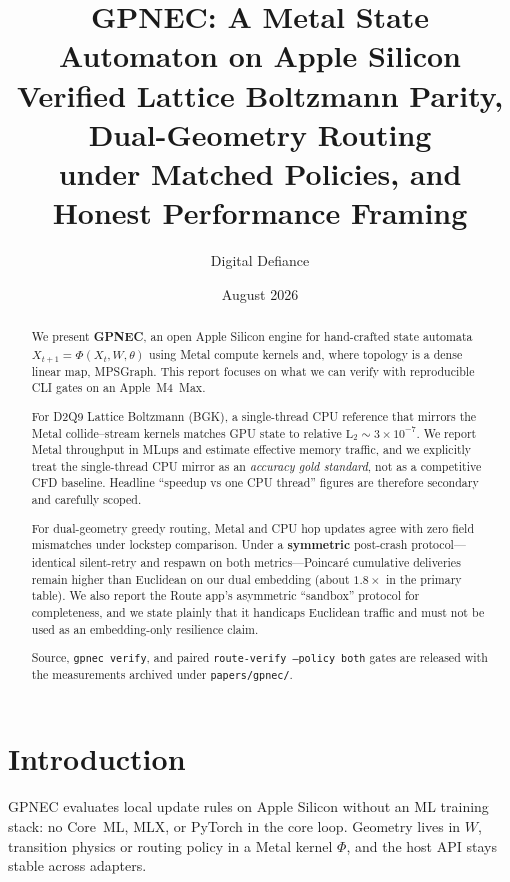 \documentclass[11pt,a4paper]{article}
\title{GPNEC: A Metal State Automaton on Apple Silicon\\
\large Verified Lattice Boltzmann Parity, Dual-Geometry Routing\\
under Matched Policies, and Honest Performance Framing}
\author{Digital Defiance}
\date{August 2026}
\begin{document}
\maketitle

\begin{abstract}
We present \textbf{GPNEC}, an open Apple Silicon engine for hand-crafted
state automata $X_{t+1}=\Phi(X_t,W,\theta)$ using Metal compute kernels and,
where topology is a dense linear map, MPSGraph. This report focuses on what
we can verify with reproducible CLI gates on an Apple~M4~Max.

For D2Q9 Lattice Boltzmann (BGK), a single-thread CPU reference that mirrors
the Metal collide--stream kernels matches GPU state to relative
$\mathrm{L}_2\sim3\times10^{-7}$. We report Metal throughput in MLups and
estimate effective memory traffic, and we explicitly treat the single-thread
CPU mirror as an \emph{accuracy gold standard}, not as a competitive CFD
baseline. Headline ``speedup vs one CPU thread'' figures are therefore
secondary and carefully scoped.

For dual-geometry greedy routing, Metal and CPU hop updates agree with zero
field mismatches under lockstep comparison. Under a \textbf{symmetric}
post-crash protocol---identical silent-retry and respawn on both
metrics---Poincar\'e cumulative deliveries remain higher than Euclidean on
our dual embedding (about $1.8\times$ in the primary table). We also report
the Route app's asymmetric ``sandbox'' protocol for completeness, and we
state plainly that it handicaps Euclidean traffic and must not be used as an
embedding-only resilience claim.

Source, \texttt{gpnec verify}, and paired \texttt{route-verify --policy both}
gates are released with the measurements archived under
\texttt{papers/gpnec/}.
\end{abstract}

\tableofcontents
\newpage

\section{Introduction}
\label{sec:intro}

GPNEC evaluates local update rules on Apple Silicon without an ML training
stack: no Core~ML, MLX, or PyTorch in the core loop. Geometry lives in $W$,
transition physics or routing policy in a Metal kernel $\Phi$, and the host
API stays stable across adapters.
\end{document}
